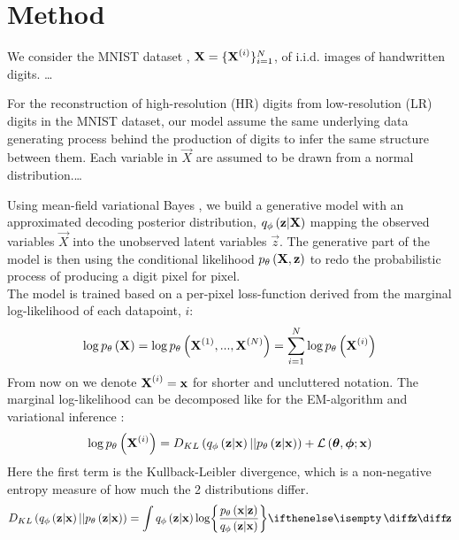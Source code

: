 \section{Method}
\label{sec:method}

We consider the MNIST dataset \cite{MNIST}, $\bm{\mathrm{X}} = \{\bm{\mathrm{X}}^{(i)}\}^N_{i=1}$, of i.i.d. images of handwritten digits. \dots

For the reconstruction of high-resolution (HR) digits from low-resolution (LR) digits in the MNIST dataset, our model assume the same underlying data generating process behind the production of digits to infer the same structure between them. Each variable in $\vec{X}$ are assumed to be drawn from a normal distribution.\dots 

Using mean-field variational Bayes \cite{Kingma2013}, we build a generative model with an approximated decoding posterior distribution, $q_{\phi}\left(\bm{\mathrm{z}}|\bm{\mathrm{X}}\right)$ mapping the observed variables $\vec{X}$ into the unobserved latent variables $\vec{z}$. The generative part of the model is then using the conditional likelihood $p_{\theta}\left(\bm{\mathrm{X}},\bm{\mathrm{z}}\right)$ to redo the probabilistic process of producing a digit pixel for pixel. \\  
The model is trained based on a per-pixel loss-function derived from the marginal log-likelihood of each datapoint, $i$:
\begin{equation}
	\log p_{\theta}\left(\bm{\mathrm{X}}\right) = \log p_{\theta}\left(\bm{\mathrm{X}}^{(1)}, ..., \bm{\mathrm{X}}^{(N)}\right) = \sum^N_{i=1} \log p_{\theta}\left(\bm{\mathrm{X}}^{(i)}\right) 
\end{equation}
From now on we denote $\bm{\mathrm{X}}^{(i)} = \bm{\mathrm{x}}$ for shorter and uncluttered notation.
The marginal log-likelihood can be decomposed like for the EM-algorithm and variational inference \cite[\S10.2]{Bishop2006}:
\begin{equation}
	\log p_{\theta}\left(\bm{\mathrm{X}}^{(i)}\right) = D_{KL}\left( q_{\phi}\left(\bm{\mathrm{z}}|\bm{\mathrm{x}}\right)||p_{\theta}\left(\bm{\mathrm{z}}|\bm{\mathrm{x}}\right)\right) + \mathcal{L}\left(\bm{\mathrm{\theta}},\bm{\mathrm{\phi}};\bm{\mathrm{x}}\right)
\end{equation} 
Here the first term is the Kullback-Leibler divergence, which is a non-negative entropy measure of how much the 2 distributions differ.
\begin{equation}
	D_{KL}\left( \enc{\vec{z}|\vec{x}}||\dec{\vec{z}|\vec{x}}\right) = \int \enc{\vec{z}|\vec{x}} \log \curlies*{ \frac{\dec{\vec{x}|\vec{z}}}{\enc{\vec{z}|\vec{x}} } } \D{\vec{z}}
\end{equation}


